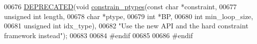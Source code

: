 \begin{DoxyCode}
00676 \mbox{\hyperlink{constraints__hard_8h_aab347a3c03fbe8e7319551b9fa0cce4a}{DEPRECATED}}(\textcolor{keywordtype}{void} \mbox{\hyperlink{constraints__hard_8h_a36c3a6c3218b041f992052767bc74549}{constrain\_ptypes}}(\textcolor{keyword}{const} \textcolor{keywordtype}{char}   *constraint,
00677                                  \textcolor{keywordtype}{unsigned} \textcolor{keywordtype}{int} length,
00678                                  \textcolor{keywordtype}{char}         *ptype,
00679                                  \textcolor{keywordtype}{int}          *BP,
00680                                  \textcolor{keywordtype}{int}          min\_loop\_size,
00681                                  \textcolor{keywordtype}{unsigned} \textcolor{keywordtype}{int} idx\_type),
00682           \textcolor{stringliteral}{"Use the new API and the hard constraint framework instead"});
00683 
00684 \textcolor{preprocessor}{#endif}
00685 
00686 \textcolor{preprocessor}{#endif}
\end{DoxyCode}
